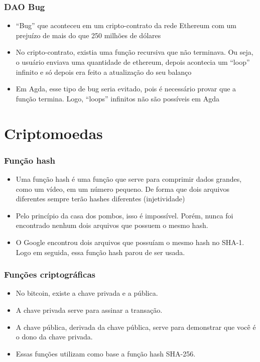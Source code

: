 \documentclass{beamer}
\begin{document}
\begin{frame}
  \frametitle{DAO Bug}
  \begin{itemize}
    \item \foreignquote{english}{Bug} que aconteceu em um cripto-contrato da rede Ethereum com um prejuízo de mais do que 250 milhões de dólares
      \cite{wood2014ethereum}
    \item No cripto-contrato, existia uma função recursiva que não terminava.
      Ou seja, o usuário enviava uma quantidade de ethereum,
      depois acontecia um \foreignquote{english}{loop} infinito e só depois era feito a atualização do seu balanço
    \item Em Agda, esse tipo de bug seria evitado, pois é necessário provar que a função termina.
      Logo, \foreignquote{english}{loops} infinitos não são possíveis em Agda
  \end{itemize}
\end{frame}

\section{Criptomoedas}
\begin{frame}
  \frametitle{Função hash}
  \begin{itemize}
    \item Uma função hash é uma função que serve para comprimir dados grandes, como um vídeo,
      em um número pequeno.
      De forma que dois arquivos diferentes sempre terão hashes diferentes (injetividade)
    \item Pelo princípio da casa dos pombos, isso é impossível.
      Porém, nunca foi encontrado nenhum dois arquivos que possuem o mesmo hash.
    \item O Google encontrou dois arquivos que possuíam o mesmo hash no SHA-1.
      Logo em seguida, essa função hash parou de ser usada.
  \end{itemize}
\end{frame}

\begin{frame}
  \frametitle{Funções criptográficas}
  \begin{itemize}
    \item No bitcoin, existe a chave privada e a pública.
    \item A chave privada serve para assinar a transação.
    \item A chave pública, derivada da chave pública,
      serve para demonstrar que você é o dono da chave privada.
    \item Essas funções utilizam como base a função hash SHA-256.
  \end{itemize}
\end{frame}
\end{document}
